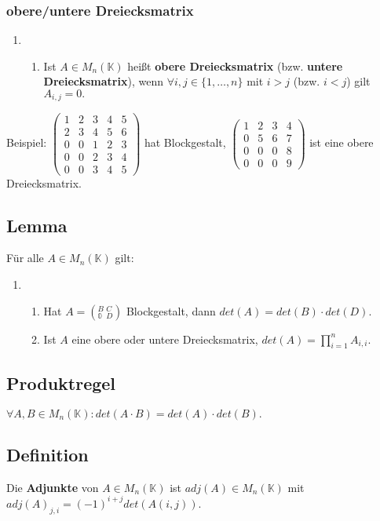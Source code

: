 \documentclass[titlepage]{article}
\newcommand{\K}{\mathbb{K}}
\newcommand{\1}{\mathbb{1}}
\newcommand{\0}{\mathbb{0}}
\begin{document}
				\subsubsection{obere/untere Dreiecksmatrix}
					\begin{enumerate}
						\item []
						\begin{enumerate}
							\item Ist $A\in M_n(\K)$ heißt \textbf{obere Dreiecksmatrix} (bzw. \textbf{untere Dreiecksmatrix}), wenn $\forall i,j\in\{1,\dots,n\}$ mit $i>j$ (bzw. $i<j$) gilt $A_{i,j}=0.$
						\end{enumerate}
					\end{enumerate}
			Beispiel: $\left(\begin{smallmatrix}1&2&3&4&5\\2&3&4&5&6\\0&0&1&2&3\\0&0&2&3&4\\0&0&3&4&5\end{smallmatrix}\right)$ hat Blockgestalt, $\left(\begin{smallmatrix}1&2&3&4\\0&5&6&7\\0&0&0&8\\0&0&0&9\end{smallmatrix}\right)$ ist eine obere Dreiecksmatrix.
				
			\subsection{Lemma}
				Für alle $A\in M_n(\K)$ gilt:
				\begin{enumerate}
					\item []
					\begin{enumerate}
						\item Hat $A=(^B_\0\,^C_D)$ Blockgestalt, dann $det(A)=det(B)\cdot det(D).$
						\item Ist $A$ eine obere oder untere Dreiecksmatrix, $det(A)=\prod\limits^n_{i=1}A_{i,i}.$
					\end{enumerate}
				\end{enumerate}
			\subsection{Produktregel}
				$\forall A,B\in M_n(\K):det(A\cdot B)=det(A)\cdot det(B).$
			\subsection{Definition}
				Die \textbf{Adjunkte} von $A\in M_n(\K)$ ist $adj(A)\in M_n(\K)$ mit $adj(A)_{j,i}=(-1)^{i+j}det(A(i,j)).$
\end{document}
